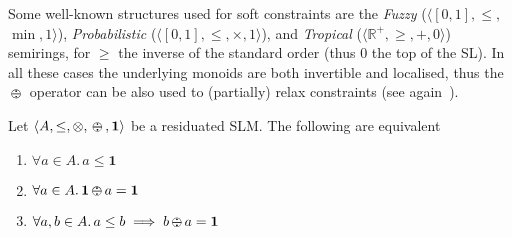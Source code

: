 \documentclass{llncs}
\def\1{{\mathbf 1}}
\newcommand{\comment}[1]{}
\def\monid{{\mathbf 0}}
\def\1{{\mathbf 1}}
\def\monop{\otimes}
\def\odiv{\, {\ominus\hspace{-7.7pt} \div} \,}
\def\monid{\mathbf{1}}
\begin{document}
\begin{remark}\label{rmk:soft}
	Some well-known structures used for soft constraints are the 
	\emph{Fuzzy} ($\langle [0,1], \leq,$ $\min, 1 \rangle$), \emph{Probabilistic} ($\langle [0,1], \leq, \allowbreak\times, 1 \rangle$), 
	and \emph{Tropical}   ($\langle \mathbb{R}^+, \geq, +, 0 \rangle$) semirings, for $\geq$ the inverse of the standard order 
	(thus $0$ the top of the SL). In all these cases the underlying monoids 
	are both invertible and localised, thus
	the $\odiv$ operator can be also used to
	(partially) relax constraints (see again~\cite{ecai06}).
\end{remark}



\comment{
%
Distributivity holds also for the empty set and for infinite sets, if the necessary LUBs exist.
%
Instead, it holds only partially for $\odiv$: this follows directly from the monotonicity of $\odiv$ on the first argument, 
since it implies that $x \odiv a \leq \bigvee X \odiv a$ for all $x \in X$.

\begin{lemma}
	\label{distodiv}
	Let $\langle A, \leq, \monop, \odiv, \monid \rangle$ be an ReSL and $X \subseteq A$ a finite non-empty set. Then 
	\begin{itemize}
		\item $\forall a \in A.\, \bigvee \{ x \odiv a \mid x \in X \} \leq \bigvee X \odiv a$
	\end{itemize}	
\end{lemma}


Also this inequation holds for the empty set and for infinite sets, if the necessary LUBs exist.
%
Moreover, it also holds that $\bigvee \{ a \odiv x \mid x \in X \} \geq a \odiv \bigvee X$, since $\odiv$ is anti-monotone on the second argument.
}

\begin{proposition}\label{reabs}
	Let $\langle A, \leq, \monop, \odiv, \monid \rangle$ be a residuated SLM. The following are equivalent
	\begin{enumerate}
		\item $\forall a \in A.\, a \leq \1$
		\item $\forall a \in A.\, \1 \odiv a = \1$		
		\item $\forall a, b \in A.\, a \leq b \implies b \odiv a = \1$
	\end{enumerate}	
\end{proposition}
\end{document}
